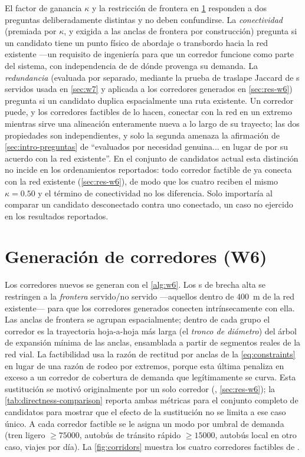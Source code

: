 El factor de ganancia $\kappa$ y la restricción de frontera en \cref{sec:w6} responden a
dos preguntas deliberadamente distintas y no deben confundirse. La \emph{conectividad}
(premiada por $\kappa$, y exigida a las anclas de frontera por construcción) pregunta si
un candidato tiene un punto físico de abordaje o transbordo hacia la red existente ---un
requisito de ingeniería para que un corredor funcione como parte del sistema, con
independencia de de dónde provenga su demanda. La \emph{redundancia} (evaluada por
separado, mediante la prueba de traslape Jaccard de \ageb{}s servidos usada en
\cref{sec:w7} y aplicada a los corredores generados en \cref{sec:res-w6}) pregunta si un
candidato duplica espacialmente una ruta existente. Un corredor puede, y los corredores
factibles de \zmg lo hacen, conectar con la red en un extremo mientras sirve una
alineación enteramente nueva a lo largo de su trayecto; las dos propiedades son
independientes, y solo la segunda amenaza la afirmación de \cref{sec:intro-preguntas} de
``evaluados por necesidad genuina... en lugar de por su acuerdo con la red existente''.
En el conjunto de candidatos actual esta distinción no incide en los ordenamientos
reportados: todo corredor factible de \zmg ya conecta con la red existente
(\cref{sec:res-w6}), de modo que los cuatro reciben el mismo $\kappa=0.50$ y el término de
conectividad no los diferencia. Solo importaría al comparar un candidato desconectado
contra uno conectado, un caso no ejercido en los resultados reportados.

\section{Generación de corredores (W6)}
\label{sec:w6}

Los corredores nuevos se generan con el \cref{alg:w6}. Los \ageb{}s de brecha alta
se restringen a la \emph{frontera} servido/no servido ---aquellos dentro de
\SI{400}{\metre} de la red existente--- para que los corredores generados conecten
intrínsecamente con ella. Las anclas de frontera se agrupan espacialmente; dentro de
cada grupo el corredor es la trayectoria hoja-a-hoja más larga (el \emph{tronco de
diámetro}) del árbol de expansión mínima de las anclas, ensamblada a partir de
segmentos reales de la red vial. La factibilidad usa la razón de rectitud por anclas
de la \cref{eq:constraints} en lugar de una razón de rodeo por extremos, porque esta
última penaliza en exceso a un corredor de cobertura de demanda que legítimamente se
curva. Esta sustitución se motivó originalmente por un solo corredor (,
\cref{sec:res-w6}); la \cref{tab:directness-comparison} reporta ambas métricas para el
conjunto completo de candidatos para mostrar que el efecto de la sustitución no se
limita a ese caso único. A cada corredor factible se le asigna un modo por umbral de demanda (tren
ligero $\ge \num{75000}$, autobús de tránsito rápido $\ge \num{15000}$, autobús
local en otro caso, viajes por día). La \cref{fig:corridors} muestra los cuatro
corredores factibles de \zmg.

